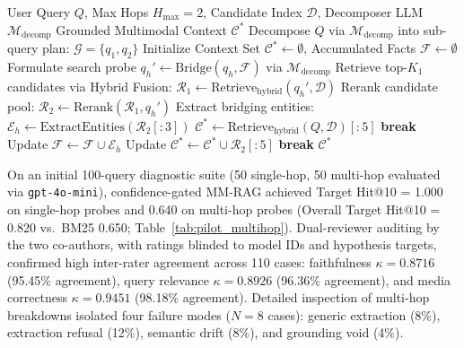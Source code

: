 \documentclass[conference]{IEEEtran}
\begin{document}
\begin{algorithm}[t]
\caption{Multi-Hop Cross-Modal Retrieval Procedure}
\label{alg:multihop}
\begin{algorithmic}[1]
\small
\REQUIRE User Query $Q$, Max Hops $H_{\max}=2$, Candidate Index $\mathcal{D}$, Decomposer LLM $\mathcal{M}_{\text{decomp}}$
\ENSURE Grounded Multimodal Context $\mathcal{C}^*$
\STATE Decompose $Q$ via $\mathcal{M}_{\text{decomp}}$ into sub-query plan: $\mathcal{G} = \{q_1, q_2\}$
\STATE Initialize Context Set $\mathcal{C}^* \leftarrow \emptyset$, Accumulated Facts $\mathcal{F} \leftarrow \emptyset$
    \STATE Formulate search probe $q_h' \leftarrow \text{Bridge}(q_h, \mathcal{F})$ via $\mathcal{M}_{\text{decomp}}$
    \STATE Retrieve top-$K_1$ candidates via Hybrid Fusion: $\mathcal{R}_1 \leftarrow \text{Retrieve}_{\text{hybrid}}(q_h', \mathcal{D})$
    \STATE Rerank candidate pool: $\mathcal{R}_2 \leftarrow \text{Rerank}(\mathcal{R}_1, q_h')$
    \STATE Extract bridging entities: $\mathcal{E}_h \leftarrow \text{ExtractEntities}(\mathcal{R}_2[:3])$
        \STATE {}
        \STATE $\mathcal{C}^* \leftarrow \text{Retrieve}_{\text{hybrid}}(Q, \mathcal{D})[:5]$
        \STATE \textbf{break}
    \ENDIF
    \STATE Update $\mathcal{F} \leftarrow \mathcal{F} \cup \mathcal{E}_h$
    \STATE Update $\mathcal{C}^* \leftarrow \mathcal{C}^* \cup \mathcal{R}_2[:5]$
        \STATE \textbf{break}
    \ENDIF
\ENDFOR
\RETURN $\mathcal{C}^*$
\end{algorithmic}
\end{algorithm}

On an initial 100-query diagnostic suite (50 single-hop, 50 multi-hop evaluated via \texttt{gpt-4o-mini}), confidence-gated MM-RAG achieved Target Hit@10 = 1.000 on single-hop probes and 0.640 on multi-hop probes (Overall Target Hit@10 = 0.820 vs.\ BM25 0.650; Table~\ref{tab:pilot_multihop}). Dual-reviewer auditing by the two co-authors, with ratings blinded to model IDs and hypothesis targets, confirmed high inter-rater agreement across 110 cases: faithfulness $\kappa = 0.8716$ (95.45\% agreement), query relevance $\kappa = 0.8926$ (96.36\% agreement), and media correctness $\kappa = 0.9451$ (98.18\% agreement). Detailed inspection of multi-hop breakdowns isolated four failure modes ($N=8$ cases): generic extraction (8\%), extraction refusal (12\%), semantic drift (8\%), and grounding void (4\%).
\end{document}

